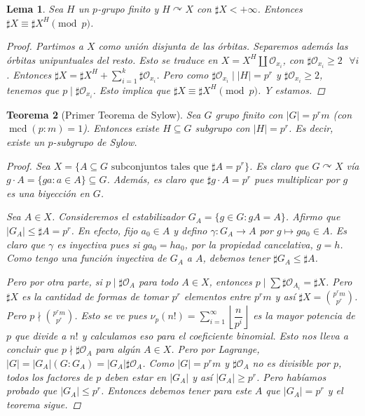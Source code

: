 \documentclass[12pt]{book}
\newtheorem{teo}{Teorema}[section]
\newtheorem{lem}[teo]{Lema}
\theoremstyle{definition}
\DeclareMathOperator{\mcd}{mcd}
\def\acts{\curvearrowright}
\begin{document}
\begin{lem}
Sea $H$ un $p$-grupo finito y $H\acts X$ con $\sharp X < +\infty$. Entonces $\sharp X\equiv \sharp X^H \pmod{p}$.
\begin{proof}
Partimos a $X$ como unión disjunta de las órbitas. Separemos además las órbitas unipuntuales del resto. Esto se traduce en $X = X^H \coprod \mathcal{O}_{x_i}$, con $\sharp \mathcal{O}_{x_i} \geq 2 \text{ }\forall i$. Entonces $\sharp X = \sharp X^H + \displaystyle\sum_{i=1}^{k}\sharp \mathcal{O}_{x_i}$. Pero como $\sharp \mathcal{O}_{x_i}\mid |H| = p^r$ y $\sharp \mathcal{O}_{x_i}\geq 2$, tenemos que $p\mid \sharp \mathcal{O}_{x_i}$. Esto implica que $\sharp X \equiv \sharp X^H \pmod{p}$. Y estamos.
\end{proof}
\end{lem}
\begin{teo}[Primer Teorema de Sylow]
Sea $G$ grupo finito con $|G|=p^r m$ (con $\mcd (p:m)=1$). Entonces existe $H\subseteq G$ subgrupo con $|H|=p^r$. Es decir, existe un $p$-subgrupo de Sylow.
\begin{proof}
Sea $X=\{A\subseteq G \text{ subconjuntos tales que } \sharp A = p^r\}$. Es claro que $G\acts X$ vía $g\cdot A = \{ga : a\in A\}\subseteq G$. Además, es claro que $\sharp g\cdot A = p^r$ pues multiplicar por $g$ es una biyección en $G$.

Sea $A\in X$. Consideremos el estabilizador $G_A = \{g\in G : gA = A\}$. Afirmo que $|G_A| \leq \sharp A = p^r$. En efecto, fijo $a_0\in A$ y defino $\gamma :G_A\to A$ por $g\mapsto g a_0 \in A$. Es claro que $\gamma$ es inyectiva pues si $ga_0 = ha_0$, por la propiedad cancelativa, $g=h$. Como tengo una función inyectiva de $G_A$ a $A$, debemos tener $\sharp G_A\leq \sharp A$.

Pero por otra parte, si $p\mid \sharp\mathcal{O}_A$ para todo $A\in X$, entonces $p\mid \displaystyle\sum \sharp \mathcal{O}_{A_i} = \sharp X$. Pero $\sharp X$ es la cantidad de formas de tomar $p^r$ elementos entre $p^r m$ y así $\sharp X = \displaystyle\binom{p^r m}{p^r}$. Pero $p\nmid\displaystyle\binom{p^r m}{p^r}$. Esto se ve pues $\nu_p(n!) = \displaystyle\sum_{i=1}^{\infty} \left\lfloor\dfrac{n}{p^i}\right\rfloor$ es la mayor potencia de $p$ que divide a $n!$ y calculamos eso para el coeficiente binomial. Esto nos lleva a concluir que $p\nmid \sharp\mathcal{O}_A$ para algún $A\in X$. Pero por Lagrange, $|G| = |G_A| (G:G_A) = |G_A| \sharp\mathcal{O}_A$. Como $|G|=p^r m$ y $\sharp\mathcal{O}_A$ no es divisible por $p$, todos los factores de $p$ deben estar en $|G_A|$ y así $|G_A|\geq p^r$. Pero habíamos probado que $|G_A| \leq p^r$. Entonces debemos tener para este $A$ que $|G_A|=p^r$ y el teorema sigue.

\end{proof}
\end{teo}
\end{document}
